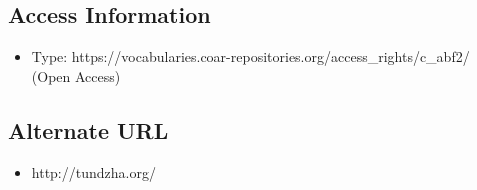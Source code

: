 \begin{framed}
{\subsection*{Access Information}
\begin{itemize}
\item Type: https://vocabularies.coar-repositories.org/access\_rights/c\_abf2/ (Open Access)
\end{itemize}

\subsection*{Alternate URL}
\begin{itemize}
\item http://tundzha.org/
\end{itemize}

}

\end{framed}